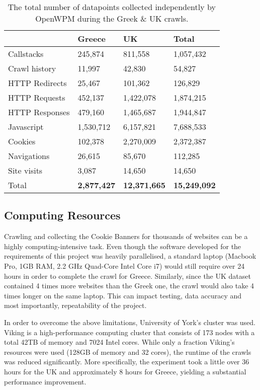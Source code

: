 \documentclass[../main.tex]{subfiles}
\begin{document}
\begin{table}[ht]
    \centering
    \begin{tabular}{@{}llll@{}}
        \toprule
                       & Greece             & UK         & Total        \\ \midrule
        Callstacks     & 245,874            & 811,558    & 1,057,432    \\
        Crawl history  & 11,997             & 42,830     & 54,827       \\
        HTTP Redirects & 25,467             & 101,362    & 126,829      \\
        HTTP Requests  & 452,137            & 1,422,078  & 1,874,215    \\
        HTTP Responses & 479,160            & 1,465,687  & 1,944,847    \\
        Javascript     & 1,530,712          & 6,157,821  & 7,688,533    \\
        Cookies        & 102,378            & 2,270,009  & 2,372,387    \\
        Navigations    & 26,615             & 85,670     & 112,285      \\
        Site visits    & 3,087              & 14,650     & 14,650       \\
        Total          & \textbf{2,877,427} & \textbf{12,371,665} & \textbf{15,249,092} \\ \bottomrule
    \end{tabular}
    \caption{The total number of datapoints collected independently by OpenWPM during the Greek \& UK crawls.}
    \label{tab:data_open_wpm}
\end{table}

\subsection{Computing Resources}
Crawling and collecting the Cookie Banners for thousands of websites can be a highly computing-intensive task. Even though the software developed for the requirements of this project was heavily parallelised, a standard laptop (Macbook Pro, 1GB RAM, 2.2 GHz Quad-Core Intel Core i7) would still require over 24 hours in order to complete the crawl for Greece. Similarly, since the UK dataset contained 4 times more websites than the Greek one, the crawl would also take 4 times longer on the same laptop. This can impact testing, data accuracy and most importantly, repeatability of the project. 

In order to overcome the above limitations, University of York’s  \cite{viking} cluster was used. Viking is a high-performance computing cluster that consists of 173 nodes with a total 42TB of memory and 7024 Intel cores. While only a fraction Viking’s resources were used (128GB of memory and 32 cores), the runtime of the crawls was reduced significantly. More specifically, the experiment took a little over 36 hours for the UK and approximately 8 hours for Greece, yielding a substantial performance improvement.
\end{document}
